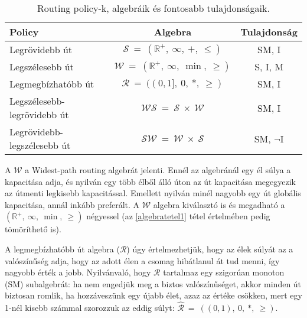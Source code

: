   \begin{table}[ht]
    \footnotesize
    \centering
    \begin{tabular}{ | l | c | c |}
    \hline
    Policy & Algebra & Tulajdonság\\
    \hline
    Legrövidebb út & $\mathcal{S}~=~(\mathbb{R}^{+},~\infty,~+,~\leq)$ & SM, I\\
    Legszélesebb út & $\mathcal{W}~=~(\mathbb{R}^{+},~\infty,~\min,~\geq)$ & S, I, M\\
    Legmegbízhatóbb út &  $\mathcal{R}~=~((0,1],~0,~*,~\geq)$ & SM, I\\
    Legszélesebb-legrövidebb út & $\mathcal{WS}~=~\mathcal{S}~\times~\mathcal{W}$ & SM, I\\
    Legrövidebb-legszélesebb út & $\mathcal{SW}~=~\mathcal{W}~\times~\mathcal{S}$ & SM, $\neg$I\\
    \hline
    \end{tabular}
    \caption{Routing policy-k, algebráik és fontosabb tulajdonságaik.}
    \label{tab:table_algebrapeldak}
  \end{table}

  A $\mathcal{W}$ a Widest-path routing algebrát jelenti\cite{Quality_of_service_routing_for_supporting_multimedia_applications}. Ennél az algebránál egy él súlya a kapacitása adja, és nyilván egy több élből álló úton az út kapacitása megegyezik az útmenti legkisebb kapacitással. Emellett nyilván minél nagyobb egy út globális kapacitása, annál inkább preferált. A $\mathcal{W}$ algebra kiválasztó is és megadható a $(\mathbb{R}^{+},~\infty,~\min,~\geq)$ négyessel (az \eqref{algebratetel1} tétel értelmében pedig tömöríthető is).

  A legmegbízhatóbb út algebra ($\mathcal{R}$) úgy értelmezhetjük, hogy az élek súlyát az a valószínűség adja, hogy az adott élen a csomag hibátlanul át tud menni, így nagyobb érték a jobb. Nyilvánvaló, hogy $\mathcal{R}$ tartalmaz egy szigorúan monoton (SM) subalgebrát: ha nem engedjük meg a biztos valószínűséget, akkor minden út biztosan romlik, ha hozzáveszünk egy újabb élet, azaz az értéke csökken, mert egy 1-nél kisebb számmal szorozzuk az eddig súlyt: $\hat{\mathcal{R}}~=~((0,1),~0,~*,~\geq)$.

